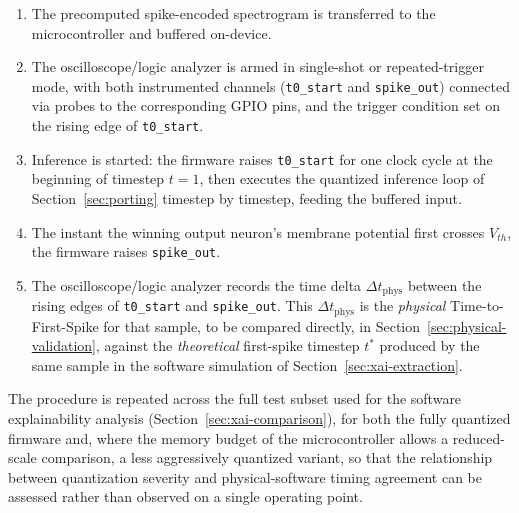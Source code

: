 \begin{enumerate}
    \item The precomputed spike-encoded spectrogram is transferred to the microcontroller and buffered on-device.
    \item The oscilloscope/logic analyzer is armed in single-shot or repeated-trigger mode, with both instrumented channels (\texttt{t0\_start} and \texttt{spike\_out}) connected via probes to the corresponding GPIO pins, and the trigger condition set on the rising edge of \texttt{t0\_start}.
    \item Inference is started: the firmware raises \texttt{t0\_start} for one clock cycle at the beginning of timestep $t=1$, then executes the quantized inference loop of Section~\ref{sec:porting} timestep by timestep, feeding the buffered input.
    \item The instant the winning output neuron's membrane potential first crosses $V_{th}$, the firmware raises \texttt{spike\_out}.
    \item The oscilloscope/logic analyzer records the time delta $\Delta t_{\text{phys}}$ between the rising edges of \texttt{t0\_start} and \texttt{spike\_out}. This $\Delta t_{\text{phys}}$ is the \emph{physical} Time-to-First-Spike for that sample, to be compared directly, in Section~\ref{sec:physical-validation}, against the \emph{theoretical} first-spike timestep $t^{*}$ produced by the same sample in the software simulation of Section~\ref{sec:xai-extraction}.
\end{enumerate}

The procedure is repeated across the full test subset used for the software explainability analysis (Section~\ref{sec:xai-comparison}), for both the fully quantized firmware and, where the memory budget of the microcontroller allows a reduced-scale comparison, a less aggressively quantized variant, so that the relationship between quantization severity and physical-software timing agreement can be assessed rather than observed on a single operating point.
